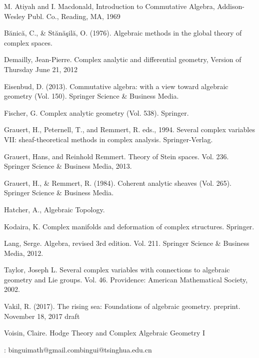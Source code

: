 \documentclass[12pt,b5paper,notitlepage]{report}
\theoremstyle{definition}
\theoremstyle{plain}
\numberwithin{equation}{section}
\begin{document}
\printindex	






	\begin{thebibliography}{999999}
		\footnotesize	


M. Atiyah and I. Macdonald, Introduction to Commutative Algebra, Addison-Wesley Publ. Co., Reading, MA, 1969

Bănică, C., \& Stănăşilă, O. (1976). Algebraic methods in the global theory of complex spaces.

Demailly, Jean-Pierre. Complex analytic and differential geometry, Version of Thursday June 21, 2012

Eisenbud, D. (2013). Commutative algebra: with a view toward algebraic geometry (Vol. 150). Springer Science \& Business Media.


Fischer, G.  Complex analytic geometry (Vol. 538). Springer.


Grauert, H., Peternell, T., and Remmert, R. eds., 1994. Several complex variables VII: sheaf-theoretical methods in complex analysis. Springer-Verlag.


Grauert, Hans, and Reinhold Remmert. Theory of Stein spaces. Vol. 236. Springer Science \& Business Media, 2013.


Grauert, H., \& Remmert, R. (1984). Coherent analytic sheaves (Vol. 265). Springer Science \& Business Media.

Hatcher, A., Algebraic Topology.

Kodaira, K.  Complex manifolds and deformation of complex structures. Springer.

Lang, Serge. Algebra, revised 3rd edition. Vol. 211. Springer Science \& Business Media, 2012.









Taylor, Joseph L. Several complex variables with connections to algebraic geometry and Lie groups. Vol. 46. Providence: American Mathematical Society, 2002.




Vakil, R. (2017). The rising sea: Foundations of algebraic geometry. preprint. November 18, 2017 draft
		


Voisin, Claire. Hodge Theory and Complex Algebraic Geometry I


		
\end{thebibliography}


: binguimath@gmail.com\qquad bingui@tsinghua.edu.cn
\end{document}
